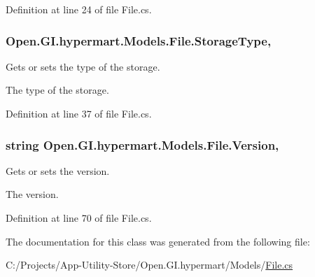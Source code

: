 Definition at line 24 of file File.\+cs.

\hypertarget{class_open_1_1_g_i_1_1hypermart_1_1_models_1_1_file_a4d6910e1f3277beb5b50309e8139a356}{}
\subsubsection[{Storage\+Type}]{ Open.\+G\+I.\+hypermart.\+Models.\+File.\+Storage\+Type\hspace{0.3cm}{\ttfamily [get]}, {\ttfamily [set]}}\label{class_open_1_1_g_i_1_1hypermart_1_1_models_1_1_file_a4d6910e1f3277beb5b50309e8139a356}


Gets or sets the type of the storage. 

The type of the storage. 

Definition at line 37 of file File.\+cs.

\hypertarget{class_open_1_1_g_i_1_1hypermart_1_1_models_1_1_file_a59b1cbe55394fce55d55200ea7e55cae}{}
\subsubsection[{Version}]{\setlength{\rightskip}{0pt plus 5cm}string Open.\+G\+I.\+hypermart.\+Models.\+File.\+Version\hspace{0.3cm}{\ttfamily [get]}, {\ttfamily [set]}}\label{class_open_1_1_g_i_1_1hypermart_1_1_models_1_1_file_a59b1cbe55394fce55d55200ea7e55cae}


Gets or sets the version. 

The version. 

Definition at line 70 of file File.\+cs.



The documentation for this class was generated from the following file\+:\begin{DoxyCompactItemize}
\item 
C\+:/\+Projects/\+App-\/\+Utility-\/\+Store/\+Open.\+G\+I.\+hypermart/\+Models/\hyperlink{_models_2_file_8cs}{File.\+cs}\end{DoxyCompactItemize}
